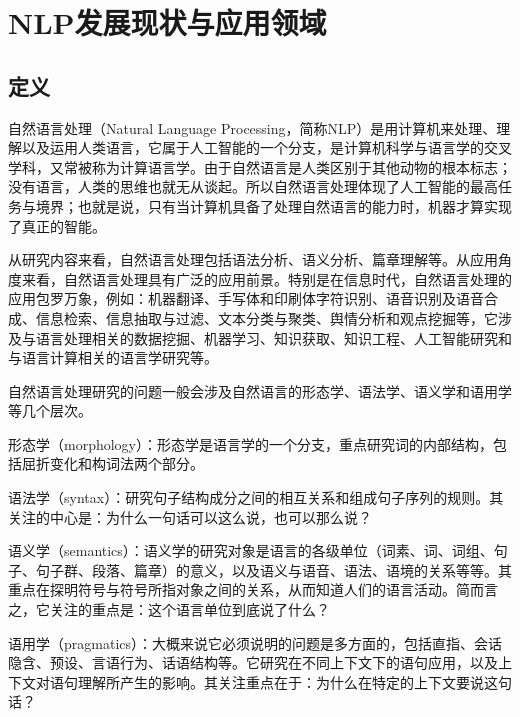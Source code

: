 %
%
%
\chapter{NLP发展现状与应用领域}
\label{basic} %

\section{定义}
自然语言处理（Natural Language Processing，简称NLP）是用计算机来处理、理解以及运用人类语言，它属于人工智能的一个分支，是计算机科学与语言学的交叉学科，又常被称为计算语言学。由于自然语言是人类区别于其他动物的根本标志；没有语言，人类的思维也就无从谈起。所以自然语言处理体现了人工智能的最高任务与境界；也就是说，只有当计算机具备了处理自然语言的能力时，机器才算实现了真正的智能。

从研究内容来看，自然语言处理包括语法分析、语义分析、篇章理解等。从应用角度来看，自然语言处理具有广泛的应用前景。特别是在信息时代，自然语言处理的应用包罗万象，例如：机器翻译、手写体和印刷体字符识别、语音识别及语音合成、信息检索、信息抽取与过滤、文本分类与聚类、舆情分析和观点挖掘等，它涉及与语言处理相关的数据挖掘、机器学习、知识获取、知识工程、人工智能研究和与语言计算相关的语言学研究等。

自然语言处理研究的问题一般会涉及自然语言的形态学、语法学、语义学和语用学等几个层次。

形态学（morphology）：形态学是语言学的一个分支，重点研究词的内部结构，包括屈折变化和构词法两个部分。

语法学（syntax）：研究句子结构成分之间的相互关系和组成句子序列的规则。其关注的中心是：为什么一句话可以这么说，也可以那么说？

语义学（semantics）：语义学的研究对象是语言的各级单位（词素、词、词组、句子、句子群、段落、篇章）的意义，以及语义与语音、语法、语境的关系等等。其重点在探明符号与符号所指对象之间的关系，从而知道人们的语言活动。简而言之，它关注的重点是：这个语言单位到底说了什么？

语用学（pragmatics）：大概来说它必须说明的问题是多方面的，包括直指、会话隐含、预设、言语行为、话语结构等。它研究在不同上下文下的语句应用，以及上下文对语句理解所产生的影响。其关注重点在于：为什么在特定的上下文要说这句话？

